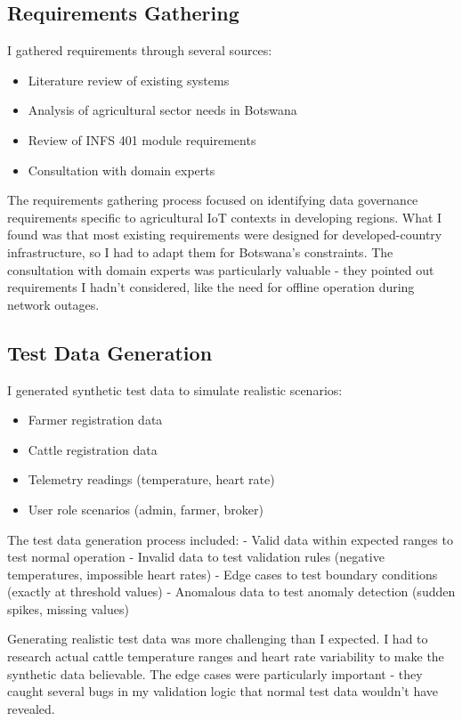 \subsection{Requirements Gathering}

I gathered requirements through several sources:

\begin{itemize}
    \item Literature review of existing systems
    \item Analysis of agricultural sector needs in Botswana
    \item Review of INFS 401 module requirements
    \item Consultation with domain experts
\end{itemize}

The requirements gathering process focused on identifying data governance requirements specific to agricultural IoT contexts in developing regions. What I found was that most existing requirements were designed for developed-country infrastructure, so I had to adapt them for Botswana's constraints. The consultation with domain experts was particularly valuable - they pointed out requirements I hadn't considered, like the need for offline operation during network outages.

\subsection{Test Data Generation}

I generated synthetic test data to simulate realistic scenarios:

\begin{itemize}
    \item Farmer registration data
    \item Cattle registration data
    \item Telemetry readings (temperature, heart rate)
    \item User role scenarios (admin, farmer, broker)
\end{itemize}

The test data generation process included:
- Valid data within expected ranges to test normal operation
- Invalid data to test validation rules (negative temperatures, impossible heart rates)
- Edge cases to test boundary conditions (exactly at threshold values)
- Anomalous data to test anomaly detection (sudden spikes, missing values)

Generating realistic test data was more challenging than I expected. I had to research actual cattle temperature ranges and heart rate variability to make the synthetic data believable. The edge cases were particularly important - they caught several bugs in my validation logic that normal test data wouldn't have revealed.

